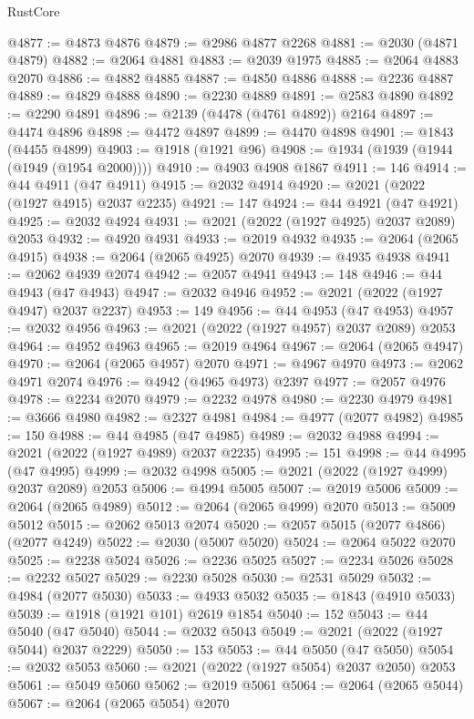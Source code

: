 \begin{lexlean}{RustCore}
\begin{coremodule}
@4877 := @4873 @4876
@4879 := @2986 @4877 @2268
@4881 := @2030 (@4871 @4879)
@4882 := @2064 @4881
@4883 := @2039 @1975
@4885 := @2064 @4883 @2070
@4886 := @4882 @4885
@4887 := @4850 @4886
@4888 := @2236 @4887
@4889 := @4829 @4888
@4890 := @2230 @4889
@4891 := @2583 @4890
@4892 := @2290 @4891
@4896 := @2139 (@4478 (@4761 @4892)) @2164
@4897 := @4474 @4896
@4898 := @4472 @4897
@4899 := @4470 @4898
@4901 := @1843 (@4455 @4899)
@4903 := @1918 (@1921 @96)
@4908 := @1934 (@1939 (@1944 (@1949 (@1954 @2000))))
@4910 := @4903 @4908 @1867
@4911 := 146
@4914 := @44 @4911 (@47 @4911)
@4915 := @2032 @4914
@4920 := @2021 (@2022 (@1927 @4915) @2037 @2235)
@4921 := 147
@4924 := @44 @4921 (@47 @4921)
@4925 := @2032 @4924
@4931 := @2021 (@2022 (@1927 @4925) @2037 @2089) @2053
@4932 := @4920 @4931
@4933 := @2019 @4932
@4935 := @2064 (@2065 @4915)
@4938 := @2064 (@2065 @4925) @2070
@4939 := @4935 @4938
@4941 := @2062 @4939 @2074
@4942 := @2057 @4941
@4943 := 148
@4946 := @44 @4943 (@47 @4943)
@4947 := @2032 @4946
@4952 := @2021 (@2022 (@1927 @4947) @2037 @2237)
@4953 := 149
@4956 := @44 @4953 (@47 @4953)
@4957 := @2032 @4956
@4963 := @2021 (@2022 (@1927 @4957) @2037 @2089) @2053
@4964 := @4952 @4963
@4965 := @2019 @4964
@4967 := @2064 (@2065 @4947)
@4970 := @2064 (@2065 @4957) @2070
@4971 := @4967 @4970
@4973 := @2062 @4971 @2074
@4976 := @4942 (@4965 @4973) @2397
@4977 := @2057 @4976
@4978 := @2234 @2070
@4979 := @2232 @4978
@4980 := @2230 @4979
@4981 := @3666 @4980
@4982 := @2327 @4981
@4984 := @4977 (@2077 @4982)
@4985 := 150
@4988 := @44 @4985 (@47 @4985)
@4989 := @2032 @4988
@4994 := @2021 (@2022 (@1927 @4989) @2037 @2235)
@4995 := 151
@4998 := @44 @4995 (@47 @4995)
@4999 := @2032 @4998
@5005 := @2021 (@2022 (@1927 @4999) @2037 @2089) @2053
@5006 := @4994 @5005
@5007 := @2019 @5006
@5009 := @2064 (@2065 @4989)
@5012 := @2064 (@2065 @4999) @2070
@5013 := @5009 @5012
@5015 := @2062 @5013 @2074
@5020 := @2057 @5015 (@2077 @4866) (@2077 @4249)
@5022 := @2030 (@5007 @5020)
@5024 := @2064 @5022 @2070
@5025 := @2238 @5024
@5026 := @2236 @5025
@5027 := @2234 @5026
@5028 := @2232 @5027
@5029 := @2230 @5028
@5030 := @2531 @5029
@5032 := @4984 (@2077 @5030)
@5033 := @4933 @5032
@5035 := @1843 (@4910 @5033)
@5039 := @1918 (@1921 @101) @2619 @1854
@5040 := 152
@5043 := @44 @5040 (@47 @5040)
@5044 := @2032 @5043
@5049 := @2021 (@2022 (@1927 @5044) @2037 @2229)
@5050 := 153
@5053 := @44 @5050 (@47 @5050)
@5054 := @2032 @5053
@5060 := @2021 (@2022 (@1927 @5054) @2037 @2050) @2053
@5061 := @5049 @5060
@5062 := @2019 @5061
@5064 := @2064 (@2065 @5044)
@5067 := @2064 (@2065 @5054) @2070

\end{coremodule}
\end{lexlean}
